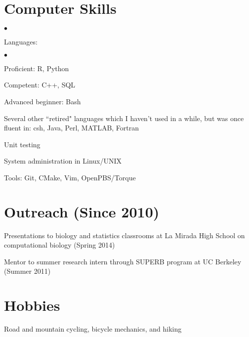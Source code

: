 \documentclass[margin,line]{res}
\newenvironment{list2}{
  \begin{list}{$\bullet$}{%
      \setlength{\itemsep}{0in}
      \setlength{\parsep}{0in} \setlength{\parskip}{0in}
      \setlength{\topsep}{0in} \setlength{\partopsep}{0in} 
      \setlength{\leftmargin}{0.2in}}}{\end{list}}
\begin{document}
\begin{resume}
\section{\sc Computer Skills} 
\begin{list2}
\item Languages:
  \begin{list2}
    \item Proficient: R, Python
    \item Competent: C++, SQL
    \item Advanced beginner: Bash
  \end{list2}
\item Several other ``retired" languages which I haven't used in a while,
  but was once fluent in: csh, Java, Perl, MATLAB, Fortran
\item Unit testing
\item System administration in Linux/UNIX
\item Tools: Git, CMake, Vim, OpenPBS/Torque\\ 
\end{list2}
\vspace{-.65cm}

\section{\sc Outreach (Since 2010)}
Presentations to biology and statistics classrooms at La Mirada High School on
computational biology (Spring 2014)

Mentor to summer research intern through SUPERB program at UC Berkeley (Summer
2011)

\vspace{-.25cm}

\section{\sc Hobbies}
Road and mountain cycling, bicycle mechanics, and hiking
\end{resume}
\end{document}
